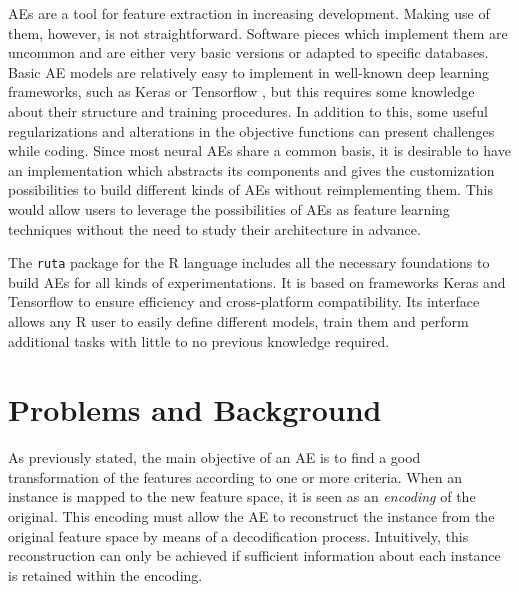 AEs are a tool for feature extraction in increasing development. {Making use of them, however, is not straightforward.} Software pieces which implement them are uncommon and are either very basic versions or adapted to specific databases. {Basic AE models are relatively easy to implement in well-known deep learning frameworks, such as Keras \cite{Keras} or Tensorflow \cite{Tensorflow}{, but this requires some knowledge about their structure and training procedures. In addition to this}, some useful regularizations and alterations in the objective functions can present challenges while coding.} Since most neural AEs share a common basis, it is desirable to have an implementation which abstracts its components and gives the customization possibilities to build different kinds of AEs without reimplementing them. {This would allow users to leverage the possibilities of AEs as feature learning techniques without the need to study their architecture in advance.}

The \texttt{ruta} package for the R language includes all the necessary foundations to build AEs for all kinds of experimentations. It is based on frameworks Keras and Tensorflow to ensure efficiency and cross-platform compatibility. {Its interface allows any R user to easily define different models, train them and perform additional tasks with little to no previous knowledge required.}




\section{Problems and Background}
\label{p2sec.background}


As previously stated, the main objective of an AE is to find a good transformation of the features according to one or more criteria. When an instance is mapped to the new feature space, it is seen as an \emph{encoding} of the original. This encoding must allow the AE to reconstruct the instance from the original feature space by means of a decodification process. Intuitively, this reconstruction can only be achieved if sufficient information about each instance is retained within the encoding.

